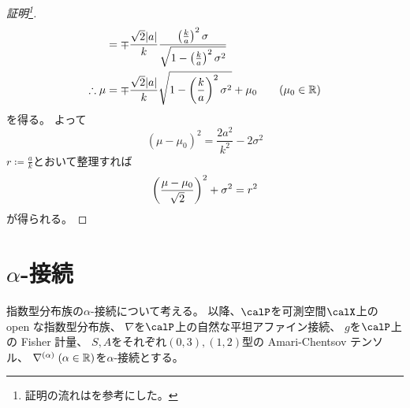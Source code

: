 \documentclass[report]{jlreq}
\begin{document}
\begin{proof}[証明\footnote{
    証明の流れは\cite[Chap.3 14.4]{Tu17}を参考にした。
}]
\begin{alignat}{1}
            &=
                \mp \frac{\sqrt{2} |a|}{k}
                \frac{
                    \left({
                        \frac{k}{a}
                    }\right)^2
                    \sigma
                }{
                    \sqrt{
                        1 - \left({
                            \frac{k}{a}
                        }\right)^2
                        \sigma^2
                    }
                }
                \\
        \therefore \mu
            &=
                \mp \frac{\sqrt{2} |a|}{k}
                \sqrt{
                    1 - \left({
                        \frac{k}{a}
                    }\right)^2
                    \sigma^2
                }
                + \mu_0
                \qquad
                (\mu_0 \in \mathbb{R})
    \end{alignat}
    を得る。
    よって
    \begin{equation}
        (\mu - \mu_0)^2
            =
                \frac{2 a^2}{k^2}
                - 2 \sigma^2
    \end{equation}
    $r \coloneqq \frac{a}{k}$とおいて整理すれば
    \begin{equation}
        \left({
            \frac{\mu - \mu_0}{\sqrt{2}}
        }\right)^2
            + \sigma^2
            = r^2
    \end{equation}
    が得られる。
\end{proof}

%
\section{$\alpha$-接続}

指数型分布族の$\alpha$-接続について考える。
以降、$\calP$を可測空間$\calX$上の open な指数型分布族、
$\nabla$を$\calP$上の自然な平坦アファイン接続、
$g$を$\calP$上の Fisher 計量、
$S, A$をそれぞれ$(0, 3), (1, 2)$型の Amari-Chentsov テンソル、
$\nabla^{(\alpha)} \; (\alpha \in \mathbb{R})$を$\alpha$-接続とする。

\end{document}
